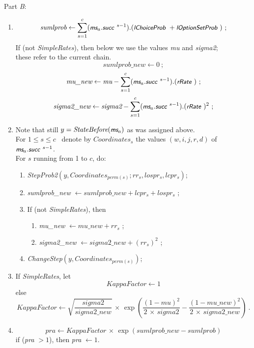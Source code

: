 \documentclass[a4paper,12pt,fleqn]{article}
\newcommand{\ttimes}{\,\times\,}
\newcommand{\nnm}[1]{\textsf{\small\textit{#1}\ }}
\newcommand{\ms}{\textsl{\textsf{\small ms}}} %
\begin{document}
Part \emph{B}:
\begin{enumerate}[resume]
\item \[ \textit{sumlprob} \leftarrow \sum_{s=1}^{c}
             (\ms_a.\nnm{succ}^{s-1}).(\nnm{lChoiceProb} + \nnm{lOptionSetProb}) \ ;
      \]
      If (not \textit{SimpleRates}), then below we use
      the values \textit{mu} and \textit{sigma2}; \\
      these refer to the current chain.
      \[
      \textit{sumlprob\_new}  \leftarrow 0 \ ;
      \]
      \[
      \textit{mu\_new}  \leftarrow \textit{mu} -  \sum_{s=1}^{c}
             (\ms_a.\nnm{succ}^{s-1}).(\nnm{rRate}) \ ;
      \]
      \[
      \textit{sigma2\_new}  \leftarrow \textit{sigma2} -  \sum_{s=1}^{c}
             (\ms_a.\nnm{succ}^{s-1}).(\nnm{rRate})^2 \ ;
      \]
\item Note that still $y =  \textit{StateBefore}(\ms_a)$ as was assigned above.\\
      For $1 \leq s \leq c$ \ denote by $\textit{Coordinates}_s$ the values
      $(w,i,j,r,d)$ of $\ms_a.\nnm{succ}^{s-1}$.\\
      For $s$ running from 1 to $c$, do:
      \begin{enumerate}
      \item \textit{StepProb2}$(y, \textit{Coordinates}_{\textit{perm}(s)};
                                            rr_s, lospr_s, lcpr_s)$;
      \item \textit{sumlprob\_new} $ \leftarrow \textit{sumlprob\_new} + lcpr_s + lospr_s $ ;
      \item If (not \textit{SimpleRates}), then
        \begin{enumerate}
        \item  \textit{mu\_new} $ \leftarrow \textit{mu\_new} + rr_s $ ;
        \item  \textit{sigma2\_new} $ \leftarrow \textit{sigma2\_new}  + (rr_s)^2  $ ;
        \end{enumerate}
      \item \textit{ChangeStep}$(y, \textit{Coordinates}_{\textit{perm}(s)})$;
      \end{enumerate}
\item If \textit{SimpleRates}, let
      \begin{equation}
      \textit{KappaFactor} \leftarrow 1
      \end{equation}
      else
      \begin{equation}
      \textit{KappaFactor} \leftarrow \sqrt{ \frac{\textit{sigma2}}{\textit{sigma2\_new}} }
                  \ttimes \exp\left( \frac{\left(1 - \textit{mu} \right)^2}{2\ttimes\textit{sigma2}}
                   - \frac{\left(1 - \textit{mu\_new} \right)^2}{2\ttimes\textit{sigma2\_new}}  \right) \ .
      \end{equation}
\item \begin{equation}
     \textit{pra}  \leftarrow \textit{KappaFactor} \ttimes \exp(\textit{sumlprob\_new} - \textit{sumlprob})
    \end{equation}
    if (\textit{pra} $ > 1$), then  \textit{pra} $ \leftarrow 1 $.
\end{enumerate}
\end{document}
